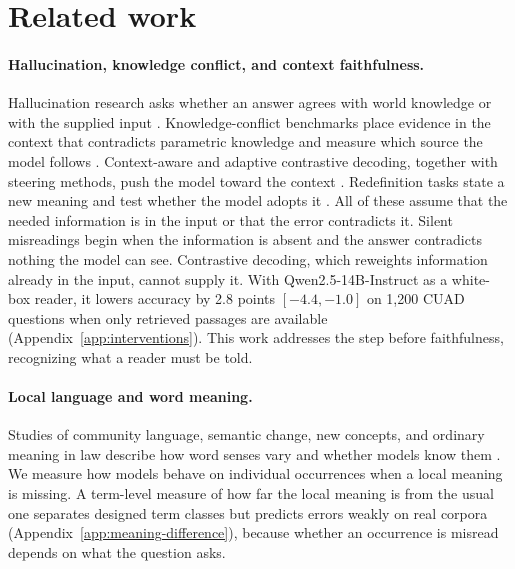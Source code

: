\section{Related work}
\label{sec:related}
\paragraph{Hallucination, knowledge conflict, and context faithfulness.}
Hallucination research asks whether an answer agrees with world knowledge or with the supplied input \citep{space}. Knowledge-conflict benchmarks place evidence in the context that contradicts parametric knowledge and measure which source the model follows \citep{longpre-etal-2021-entity,conflictbank,knowledge-conflict-faithfulness,kc-survey}. Context-aware and adaptive contrastive decoding, together with steering methods, push the model toward the context \citep{cad,adacad,coiecd,contextfocus,taming-kc}. Redefinition tasks state a new meaning and test whether the model adopts it \citep{inverse-scaling,redefine-pitfalls}. All of these assume that the needed information is in the input or that the error contradicts it. Silent misreadings begin when the information is absent and the answer contradicts nothing the model can see. Contrastive decoding, which reweights information already in the input, cannot supply it. With Qwen2.5-14B-Instruct as a white-box reader, it lowers accuracy by 2.8 points $[-4.4, -1.0]$ on 1,200 CUAD questions when only retrieved passages are available (Appendix~\ref{app:interventions}). This work addresses the step before faithfulness, recognizing what a reader must be told.

\paragraph{Local language and word meaning.}
Studies of community language, semantic change, new concepts, and ordinary meaning in law describe how word senses vary and whether models know them \citep{lucy-bamman-glossaries,lsc-survey,semeval2020-lsc,slang,legal-interpretation}. We measure how models behave on individual occurrences when a local meaning is missing. A term-level measure of how far the local meaning is from the usual one separates designed term classes but predicts errors weakly on real corpora (Appendix~\ref{app:meaning-difference}), because whether an occurrence is misread depends on what the question asks.


